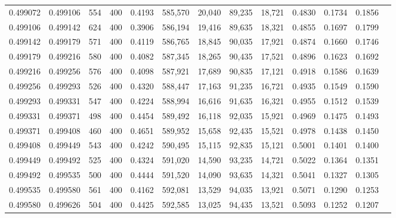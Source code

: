 \begin{tabular}{rrrrrrrrrrrrr}
0.499072 & 0.499106 &    554 & 400 &                                     0.4193 & 585,570 &  20,040 &  89,235 &  18,721 & 0.4830 & 0.1734 & 0.1856 \\
0.499106 & 0.499142 &    624 & 400 &                                     0.3906 & 586,194 &  19,416 &  89,635 &  18,321 & 0.4855 & 0.1697 & 0.1799 \\
0.499142 & 0.499179 &    571 & 400 &                                     0.4119 & 586,765 &  18,845 &  90,035 &  17,921 & 0.4874 & 0.1660 & 0.1746 \\
0.499179 & 0.499216 &    580 & 400 &                                     0.4082 & 587,345 &  18,265 &  90,435 &  17,521 & 0.4896 & 0.1623 & 0.1692 \\
0.499216 & 0.499256 &    576 & 400 &                                     0.4098 & 587,921 &  17,689 &  90,835 &  17,121 & 0.4918 & 0.1586 & 0.1639 \\
0.499256 & 0.499293 &    526 & 400 &                                     0.4320 & 588,447 &  17,163 &  91,235 &  16,721 & 0.4935 & 0.1549 & 0.1590 \\
0.499293 & 0.499331 &    547 & 400 &                                     0.4224 & 588,994 &  16,616 &  91,635 &  16,321 & 0.4955 & 0.1512 & 0.1539 \\
0.499331 & 0.499371 &    498 & 400 &                                     0.4454 & 589,492 &  16,118 &  92,035 &  15,921 & 0.4969 & 0.1475 & 0.1493 \\
0.499371 & 0.499408 &    460 & 400 &                                     0.4651 & 589,952 &  15,658 &  92,435 &  15,521 & 0.4978 & 0.1438 & 0.1450 \\
0.499408 & 0.499449 &    543 & 400 &                                     0.4242 & 590,495 &  15,115 &  92,835 &  15,121 & 0.5001 & 0.1401 & 0.1400 \\
0.499449 & 0.499492 &    525 & 400 &                                     0.4324 & 591,020 &  14,590 &  93,235 &  14,721 & 0.5022 & 0.1364 & 0.1351 \\
0.499492 & 0.499535 &    500 & 400 &                                     0.4444 & 591,520 &  14,090 &  93,635 &  14,321 & 0.5041 & 0.1327 & 0.1305 \\
0.499535 & 0.499580 &    561 & 400 &                                     0.4162 & 592,081 &  13,529 &  94,035 &  13,921 & 0.5071 & 0.1290 & 0.1253 \\
0.499580 & 0.499626 &    504 & 400 &                                     0.4425 & 592,585 &  13,025 &  94,435 &  13,521 & 0.5093 & 0.1252 & 0.1207 \\

\end{tabular}
